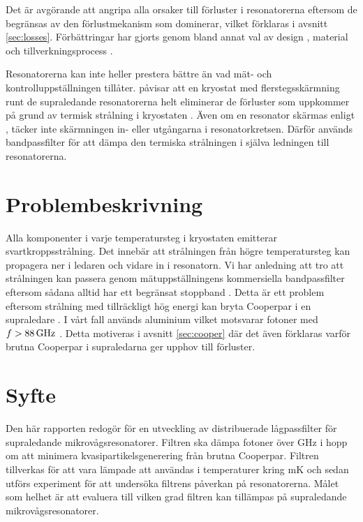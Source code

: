 \documentclass[main.tex]{subfiles}
\begin{document}
Det är avgörande att angripa alla orsaker till förluster i resonatorerna eftersom de begränsas av den förlustmekanism som dominerar, vilket förklaras i avsnitt \ref{sec:losses}. Förbättringar har gjorts genom bland annat val av design \cite{khalil2011,chiaro2016}, material \cite{Goetz2016} och tillverkningsprocess \cite{Bruno2015,Sanberg2012}.

Resonatorerna kan inte heller prestera bättre än vad mät- och kontrolluppställningen tillåter. \citeauthor{Barends2011} påvisar att en kryostat med flerstegsskärmning runt de supraledande resonatorerna helt eliminerar de förluster som uppkommer på grund av termisk strålning i kryostaten \cite{Barends2011}. Även om en resonator skärmas enligt \cite{Barends2011}, täcker inte skärmningen in- eller utgångarna i resonatorkretsen. Därför används bandpassfilter för att dämpa den termiska strålningen i själva ledningen till resonatorerna.

\section{Problembeskrivning}


Alla komponenter i varje temperatursteg i kryostaten emitterar svartkroppsstrålning. Det innebär att strålningen från högre temperatursteg kan propagera ner i ledaren och vidare in i resonatorn. Vi har anledning att tro att strålningen kan passera genom mätuppställningens kommersiella bandpassfilter eftersom sådana alltid har ett begränsat stoppband \cite{santavicca2008}. Detta är ett problem eftersom strålning med tillräckligt hög energi kan bryta Cooperpar i en supraledare \cite{Gao2008}. I vårt fall används aluminium vilket motsvarar fotoner med $f>\unit[88]{GHz}$ \cite{Barends2011}. Detta motiveras i avsnitt \ref{sec:cooper} där det även förklaras varför brutna Cooperpar i supraledarna ger upphov till förluster.

\section{Syfte}
Den här rapporten redogör för en utveckling av distribuerade lågpassfilter för supraledande mikrovågsresonatorer. Filtren ska dämpa fotoner över \unit[88]{GHz} i hopp om att minimera kvasipartikelsgenerering från brutna Cooperpar. Filtren tillverkas för att vara lämpade att användas i temperaturer kring \unit[10]{mK} och sedan utförs experiment för att undersöka filtrens påverkan på resonatorerna. Målet som helhet är att evaluera till vilken grad filtren kan tillämpas på supraledande mikrovågsresonatorer.
\end{document}
